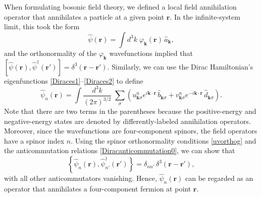 \documentclass[pra,12pt]{revtex4}
\begin{document}
When formulating bosonic field theory, we defined a local field
annihilation operator that annihilates a particle at a given point
$\mathbf{r}$.  In the infinite-system limit, this took the form
\begin{equation}
  \hat{\psi}(\mathbf{r})
  = \int d^3k \; \varphi_{\mathbf{k}}(\mathbf{r}) \, \hat{a}_{\mathbf{k}},
\end{equation}
and the orthonormality of the $\varphi_{\mathbf{k}}$ wavefunctions
implied that $[\hat{\psi}(\mathbf{r}),
  \hat{\psi}^\dagger(\mathbf{r}')] =
\delta^3(\mathbf{r}-\mathbf{r}')$.  Similarly, we can use the Dirac
Hamiltonian's eigenfunctions \eqref{Diraces1}--\eqref{Diraces2} to
define
\begin{equation}
  \hat{\psi}_n(\mathbf{r})
  = \int \frac{d^3k}{(2\pi)^{3/2}} \; \sum_\sigma
  \left(
  u^n_{\mathbf{k}\sigma} e^{i\mathbf{k}\cdot\mathbf{r}} \, \hat{b}_{\mathbf{k}\sigma}
  + v^n_{\mathbf{k}\sigma} e^{-i\mathbf{k}\cdot\mathbf{r}} \, \hat{d}_{\mathbf{k}\sigma}\right).
  \label{Diracpsi0}
\end{equation}
Note that there are two terms in the parentheses because the
positive-energy and negative-energy states are denoted by
differently-labeled annihilation operators.  Moreover, since the
wavefunctions are four-component spinors, the field operators have a
spinor index $n$.  Using the spinor orthonormality conditions
\eqref{uvorthog} and the anticommutation relations
\eqref{Diracanticommutation0}, we can show that
\begin{equation}
  \left\{\hat{\psi}_n(\mathbf{r}), \hat{\psi}_{n'}^{\dagger}(\mathbf{r}')\right\}
  = \delta_{nn'}\, \delta^3(\mathbf{r}-\mathbf{r}'),
\end{equation}
with all other anticommutators vanishing.  Hence,
$\hat{\psi}_n(\mathbf{r})$ can be regarded as an operator that
annihilates a four-component fermion at point $\mathbf{r}$.
\end{document}
